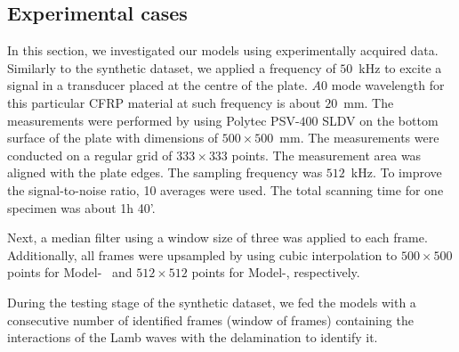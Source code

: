 \subsection{Experimental cases}
In this section, we investigated our models using experimentally acquired data.
Similarly to the synthetic dataset, we applied a frequency of \(50\)~kHz to excite a signal in a transducer placed at the centre of the plate. 
\(A0\) mode wavelength for this particular CFRP material at such frequency is about \(20\)~mm. 
The measurements were performed by using Polytec PSV-\(400\) SLDV on the bottom surface of the plate with dimensions of \(500\times 500\)~mm. 
The measurements were conducted on a regular grid of \(333\times333\) points. 
The measurement area was aligned with the plate edges.
The sampling frequency was \(512\)~kHz.
To improve the signal-to-noise ratio, 10 averages were used.
The total scanning time for one specimen was about 1h 40'.

Next, a median filter using a window size of three was applied to each frame. 
Additionally, all frames were upsampled by using cubic interpolation to \(500 \times 500\) points for Model-~ and \(512\times512\) points for Model-, respectively.

During the testing stage of the synthetic dataset, we fed the models with a consecutive number of identified frames (window of frames) containing the interactions of the Lamb waves with the delamination to identify it.

